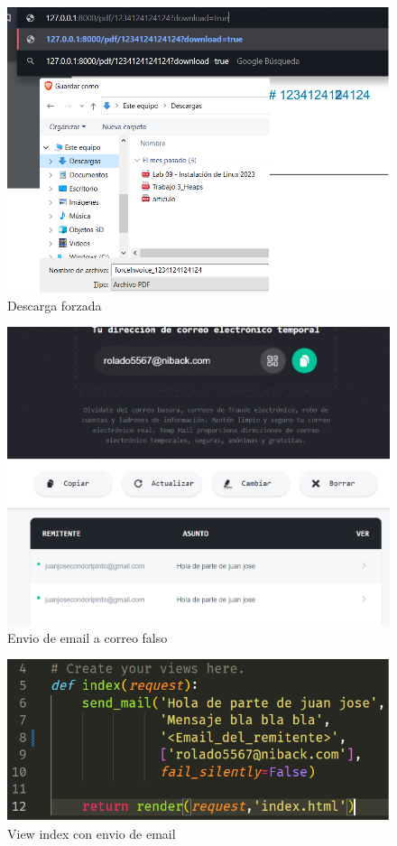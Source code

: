 \documentclass{article}
\begin{document}
        \begin{figure}
            \centering
            \includegraphics[width=150mm]{img/img11.png}
            \caption{Descarga forzada}
            \label{fig:enter-label}
        \end{figure}
        \begin{figure}
            \centering
            \includegraphics[width=150mm]{img/img12.png}
            \caption{Envio de email a correo falso}
            \label{fig:enter-label}
        \end{figure}
        \begin{figure}
            \centering
            \includegraphics[width=150mm]{img/img13.png}
            \caption{View index con envio de email}
            \label{fig:enter-label}
        \end{figure}
\end{document}
